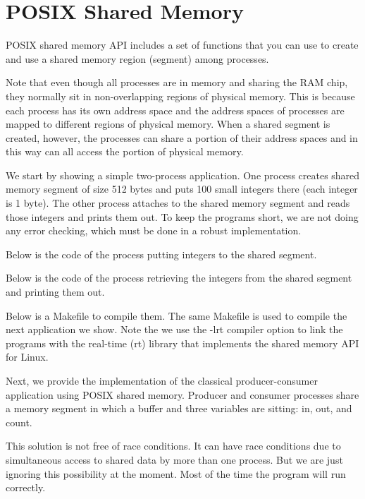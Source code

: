 \section{POSIX Shared Memory}

POSIX shared memory API includes a set of functions that you can use
to create and use a shared memory region (segment) among processes.

Note that even though all processes are in memory and sharing the RAM
chip, they normally sit in non-overlapping regions of physical
memory. This is because each process has its own address space and the
address spaces of processes are mapped to different regions of
physical memory. When a shared segment is created, however, the
processes can share a portion of their address spaces and in this way
can all access the portion of physical memory.

We start by showing a simple two-process application. One process
creates shared memory segment of size 512 bytes and puts 100 small
integers there (each integer is 1 byte). The other process attaches to
the shared memory segment and reads those integers and prints them
out. To keep the programs short, we are not doing any error checking,
which must be done in a robust implementation.

Below is the code of the process putting integers to the shared
segment.


Below is the code of the process retrieving the integers from the
shared segment and printing them out.


Below is a Makefile to compile them. The same Makefile is used to
compile the next application we show. Note the we use the -lrt
compiler option to link the programs with the real-time (rt) library
that implements the shared memory API for Linux.


Next, we provide the implementation of the classical producer-consumer
application using POSIX shared memory. Producer and consumer
processes share a memory segment in which a buffer and three variables
are sitting: in, out, and count.

This solution is not free of race conditions. It can have race
conditions due to simultaneous access to shared data by more than one
process. But we are just ignoring this possibility at the moment. Most
of the time the program will run correctly.

